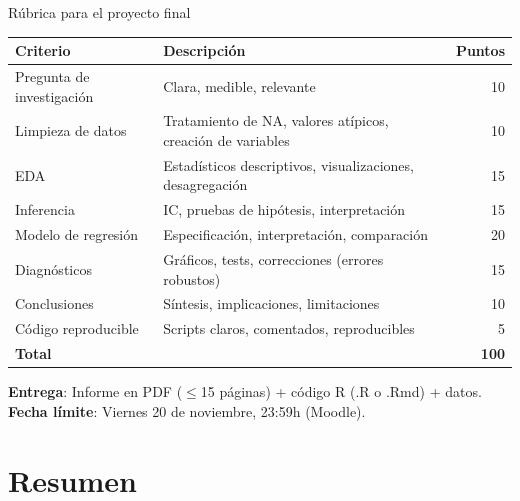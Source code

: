 \documentclass[aspectratio=169, 11pt]{beamer}
\begin{document}
\begin{frame}{R\'ubrica para el proyecto final}
\footnotesize
\begin{center}
\renewcommand{\arraystretch}{1.1}
\begin{tabular}{lp{6cm}r}
\toprule
\textbf{Criterio} & \textbf{Descripción} & \textbf{Puntos} \\
\midrule
Pregunta de investigación & Clara, medible, relevante & 10 \\
Limpieza de datos & Tratamiento de NA, valores atípicos, creación de variables & 10 \\
EDA & Estadísticos descriptivos, visualizaciones, desagregación & 15 \\
Inferencia & IC, pruebas de hipótesis, interpretación & 15 \\
Modelo de regresión & Especificación, interpretación, comparación & 20 \\
Diagnósticos & Gráficos, tests, correcciones (errores robustos) & 15 \\
Conclusiones & Síntesis, implicaciones, limitaciones & 10 \\
Código reproducible & Scripts claros, comentados, reproducibles & 5 \\
\midrule
\textbf{Total} &  & \textbf{100} \\
\bottomrule
\end{tabular}
\end{center}

\vspace{0.1cm}
\small
\textbf{Entrega}: Informe en PDF ($\leq$15 páginas) + código R (.R o .Rmd) + datos.\\
\textbf{Fecha límite}: Viernes 20 de noviembre, 23:59h (Moodle).
\end{frame}

\section{Resumen}
\end{document}
